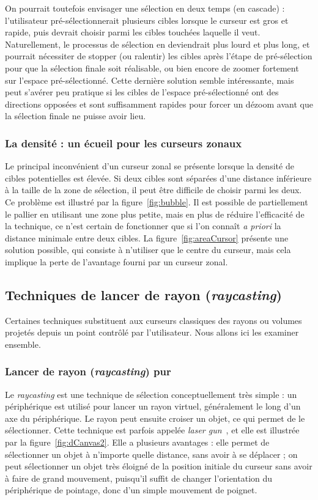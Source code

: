 	On pourrait toutefois envisager une sélection en deux temps (en cascade) : l'utilisateur pré-sélectionnerait plusieurs cibles lorsque le curseur est gros et rapide, puis devrait choisir parmi les cibles touchées laquelle il veut. Naturellement, le processus de sélection en deviendrait plus lourd et plus long, et pourrait nécessiter de stopper (ou ralentir) les cibles après l'étape de pré-sélection pour que la sélection finale soit réalisable, ou bien encore de zoomer fortement sur l'espace pré-sélectionné. Cette dernière solution semble intéressante, mais peut s'avérer peu pratique si les cibles de l'espace pré-sélectionné ont des directions opposées et sont suffisamment rapides pour forcer un \og dézoom \fg{} avant que la sélection finale ne puisse avoir lieu.

	\subsubsection{La densité : un écueil pour les curseurs zonaux}
	Le principal inconvénient d'un curseur zonal se présente lorsque la densité de cibles potentielles est élevée. Si deux cibles sont séparées d'une distance inférieure à la taille de la zone de sélection, il peut être difficile de choisir parmi les deux. Ce problème est illustré par la figure~\ref{fig:bubble}. Il est possible de partiellement le pallier en utilisant une zone plus petite, mais en plus de réduire l'efficacité de la technique, ce n'est certain de fonctionner que si l'on connaît \emph{a priori} la distance minimale entre deux cibles. La figure~\ref{fig:areaCursor} présente une solution possible, qui consiste à n'utiliser que le centre du curseur, mais cela implique la perte de l'avantage fourni par un curseur zonal.
	
	\subsection{Techniques de lancer de rayon (\emph{raycasting})}
	\label{sec:raycasting}
	Certaines techniques substituent aux curseurs classiques des rayons ou volumes projetés depuis un point contrôlé par l'utilisateur. Nous allons ici les examiner ensemble.

	\subsubsection{Lancer de rayon (\emph{raycasting}) pur}
	Le \emph{raycasting} est une technique de sélection conceptuellement très simple : un périphérique est utilisé pour lancer un rayon virtuel, généralement le long d'un axe du périphérique. Le rayon peut ensuite croiser un objet, ce qui permet de le sélectionner. Cette technique est parfois appelée \emph{laser gun}~\cite{liang1994jdcad}, et elle est illustrée par la figure~\ref{fig:dCanvas2}. Elle a plusieurs avantages : elle permet de sélectionner un objet à n'importe quelle distance, sans avoir à se déplacer ; on peut sélectionner un objet très éloigné de la position initiale du curseur sans avoir à faire de grand mouvement, puisqu'il suffit de changer l'orientation du périphérique de pointage, donc d'un simple mouvement de poignet.
	

